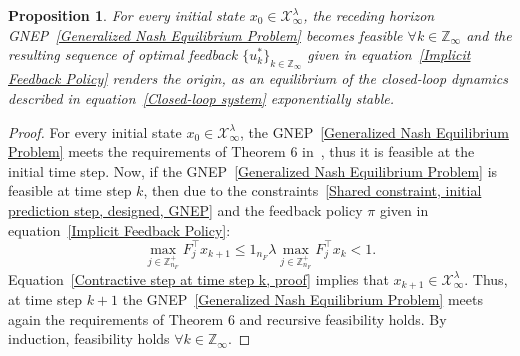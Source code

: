 \documentclass[letterpaper, 10 pt, conference]{ieeeconf}  %
\newtheorem{proposition}{Proposition}
\begin{document}
\begin{proposition}
For every initial state $x_{0} \in \mathcal{X}^{\lambda}_{\infty}$, the receding horizon GNEP~\eqref{Generalized Nash Equilibrium Problem} becomes feasible $\forall k \in \mathbb{Z}_{\infty}$ and the resulting sequence of optimal feedback $\{u^{*}_{k}\}_{k \in \mathbb{Z}_{\infty}}$ given in equation~\eqref{Implicit Feedback Policy} renders the origin, as an equilibrium of the closed-loop dynamics described in equation~\eqref{Closed-loop system} exponentially stable.
\end{proposition}
\begin{proof}
For every initial state $x_{0} \in \mathcal{X}^{\lambda}_{\infty}$, the GNEP~\eqref{Generalized Nash Equilibrium Problem} meets the requirements of Theorem 6 in~\cite{Facchinei2010gnep}, thus it is feasible at the initial time step. Now, if the GNEP~\eqref{Generalized Nash Equilibrium Problem} is feasible at time step $k$, then due to the constraints~\eqref{Shared constraint, initial prediction step, designed, GNEP} and the feedback policy $\pi$ given in equation~\eqref{Implicit Feedback Policy}:
\begin{equation}\label{Contractive step at time step k, proof}
\max_{j \in \mathbb{Z}^{+}_{n_{F}}} F^{\top}_{j}x_{k+1} \leq 1_{n_{F}} \lambda \max_{j \in \mathbb{Z}^{+}_{n_{F}}} F^{\top}_{j}x_{k} < 1.
\end{equation}
Equation~\eqref{Contractive step at time step k, proof} implies that $x_{k+1} \in \mathcal{X}^{\lambda}_{\infty}$. Thus, at time step $k+1$ the GNEP~\eqref{Generalized Nash Equilibrium Problem} meets again the requirements of Theorem 6 and recursive feasibility holds. By induction, feasibility holds $\forall k \in \mathbb{Z}_{\infty}$.


\end{proof}
\end{document}
